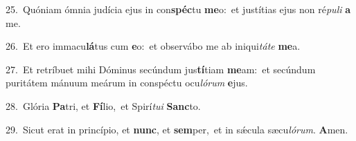 {\numbfont\textcolor{\numbcolor}{25.}}~Quóniam ómnia judícia ejus in con\-\textbf{spéc}\-tu \textbf{me}\-o:~\star et justítias ejus non ré\-\textit{pu}\-\textit{li} \textbf{a} me.\par
{\numbfont\textcolor{\numbcolor}{26.}}~Et ero immacu\-\textbf{lá}\-tus cum \textbf{e}\-o:~\star et observábo me ab iniqui\-\textit{tá}\-\textit{te} \textbf{me}\-a.\par
{\numbfont\textcolor{\numbcolor}{27.}}~Et retríbuet mihi Dóminus secúndum jus\-\textbf{tí}\-tiam \textbf{me}\-am:~\star et secúndum puritátem mánuum meárum in conspéctu ocu\-\textit{ló}\-\textit{rum} \textbf{e}\-jus.\par
{\numbfont\textcolor{\numbcolor}{28.}}~Glória \textbf{Pa}\-tri, et \textbf{Fí}\-lio,~\star et Spirí\-\textit{tu}\-\textit{i} \textbf{Sanc}\-to.\par
{\numbfont\textcolor{\numbcolor}{29.}}~Sicut erat in princípio, et \textbf{nunc}\-, et \textbf{sem}\-per,~\star et in sǽcula sæcu\-\textit{ló}\-\textit{rum}. \textbf{A}\-men.\par
